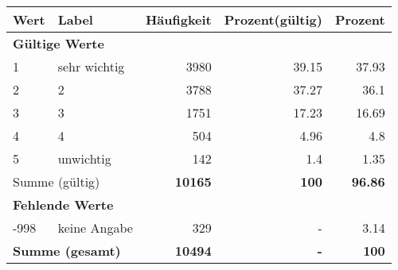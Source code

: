      \begin{longtable}{lXrrr}
     \toprule
     \textbf{Wert} & \textbf{Label} & \textbf{Häufigkeit} & \textbf{Prozent(gültig)} & \textbf{Prozent} \\
     \endhead
     \midrule
     \multicolumn{5}{l}{\textbf{Gültige Werte}}\\

     1 &
     \multicolumn{1}{X}{ sehr wichtig   } &


       \num{3980} &
       \num[round-mode=places,round-precision=2]{39.15} &
         \num[round-mode=places,round-precision=2]{37.93} \\

     2 &
     \multicolumn{1}{X}{ 2   } &


       \num{3788} &
       \num[round-mode=places,round-precision=2]{37.27} &
         \num[round-mode=places,round-precision=2]{36.1} \\

     3 &
     \multicolumn{1}{X}{ 3   } &


       \num{1751} &
       \num[round-mode=places,round-precision=2]{17.23} &
         \num[round-mode=places,round-precision=2]{16.69} \\

     4 &
     \multicolumn{1}{X}{ 4   } &


       \num{504} &
       \num[round-mode=places,round-precision=2]{4.96} &
         \num[round-mode=places,round-precision=2]{4.8} \\

     5 &
     \multicolumn{1}{X}{ unwichtig   } &


       \num{142} &
       \num[round-mode=places,round-precision=2]{1.4} &
         \num[round-mode=places,round-precision=2]{1.35} \\
     \midrule
     \multicolumn{2}{l}{Summe (gültig)} &
       \textbf{\num{10165}} &
     \textbf{\num{100}} &
       \textbf{\num[round-mode=places,round-precision=2]{96.86}} \\
     \multicolumn{5}{l}{\textbf{Fehlende Werte}}\\
       -998 &
       keine Angabe &
         \num{329} &
        - &
         \num[round-mode=places,round-precision=2]{3.14} \\
     \midrule
     \multicolumn{2}{l}{\textbf{Summe (gesamt)}} &
          \textbf{\num{10494}} &
        \textbf{-} &
        \textbf{\num{100}} \\
     \bottomrule
     \end{longtable}
     
